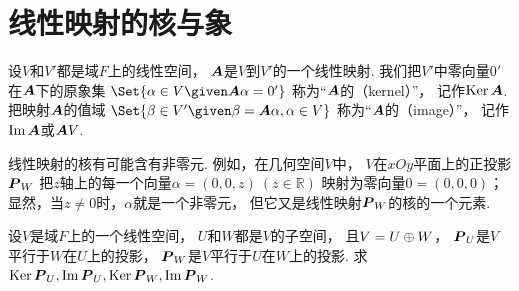 \section{线性映射的核与象}
\begin{definition}
设\(V\)和\(V'\)都是域\(F\)上的线性空间，
\(\boldsymbol{A}\)是\(V\)到\(V'\)的一个线性映射.
我们把\(V'\)中零向量\(0'\)在\(\boldsymbol{A}\)下的原象集
\(\Set{
	\alpha\in V
	\given
	\vb{A}\alpha=0'
}\)
称为“\(\boldsymbol{A}\)的（kernel）”，
记作\(\operatorname{Ker}\boldsymbol{A}\).
把映射\(\boldsymbol{A}\)的值域
\(\Set{
	\beta \in V'
	\given
	\beta = \vb{A}\alpha,
	\alpha \in V
}\)
称为“\(\boldsymbol{A}\)的（image）”，
记作\(\Im\boldsymbol{A}\)或\(\boldsymbol{A}V\).
\end{definition}
\begin{remark}
线性映射的核有可能含有非零元.
例如，在几何空间\(V\)中，
\(V\)在\(xOy\)平面上的正投影\(\boldsymbol{P}_W\)
把\(z\)轴上的每一个向量\(\alpha=(0,0,z)\ (z\in\mathbb{R})\)
映射为零向量\(0=(0,0,0)\)；
显然，当\(z\neq0\)时，\(\alpha\)就是一个非零元，
但它又是线性映射\(\boldsymbol{P}_W\)的核的一个元素.
\end{remark}

\begin{example}
设\(V\)是域\(F\)上的一个线性空间，
\(U\)和\(W\)都是\(V\)的子空间，
且\(V = U \oplus W\)，
\(\boldsymbol{P}_U\)是\(V\)平行于\(W\)在\(U\)上的投影，
\(\boldsymbol{P}_W\)是\(V\)平行于\(U\)在\(W\)上的投影.
求\(\operatorname{Ker}\boldsymbol{P}_U,
\Im\boldsymbol{P}_U,
\operatorname{Ker}\boldsymbol{P}_W,
\Im\boldsymbol{P}_W\).
\end{example}

